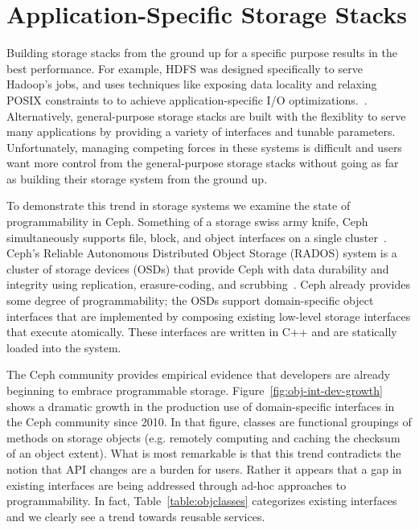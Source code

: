 \documentclass[preprint]{sigplanconf-eurosys}
\begin{document}
\section{Application-Specific Storage Stacks}
\label{sec:application-specifc-storage-stacks}

Building storage stacks from the ground up for a specific purpose results in
the best performance. For example, HDFS was designed specifically to serve
Hadoop's jobs, and uses techniques like exposing data locality and relaxing POSIX constraints to
to achieve application-specific I/O optimizations.~\cite{CITEME}. Alternatively, general-purpose storage
stacks are built with the flexiblity to serve many applications by providing a
variety of interfaces and tunable parameters. Unfortunately, managing competing
forces in these systems is difficult and users
want more control from the general-purpose storage stacks
without going as far as building their storage system from the ground up.


To demonstrate this trend in storage systems we examine the state of
programmability in Ceph. Something of a storage swiss army knife, Ceph simultaneously supports file,
block, and object interfaces on a single
cluster~\cite{ceph_contributors_ceph_2010}. Ceph's Reliable Autonomous
Distributed Object Storage (RADOS) system is a cluster of storage devices
(OSDs) that provide Ceph with data durability and integrity using replication,
erasure-coding, and scrubbing~\cite{weil_rados_2007}. Ceph already 
provides some degree of
programmability; the OSDs support domain-specific object interfaces that are
implemented by composing existing low-level storage interfaces that execute
atomically. These interfaces are
written in C++ and are statically loaded into the system.


The Ceph community provides empirical evidence that developers are already beginning to embrace
programmable storage. Figure~\ref{fig:obj-int-dev-growth} shows a dramatic
growth in the production use of domain-specific interfaces in the Ceph
community since 2010. In that figure, classes are functional groupings of methods on storage
objects (e.g. remotely computing and caching the checksum of an object extent).  What is most remarkable is that this trend contradicts the notion
that API changes are a burden for users.  Rather it appears that a gap in
existing interfaces are being addressed through ad-hoc approaches to programmability. In fact,
Table~\ref{table:objclasses} categorizes existing interfaces and we clearly see
a trend towards reusable services.
\end{document}
